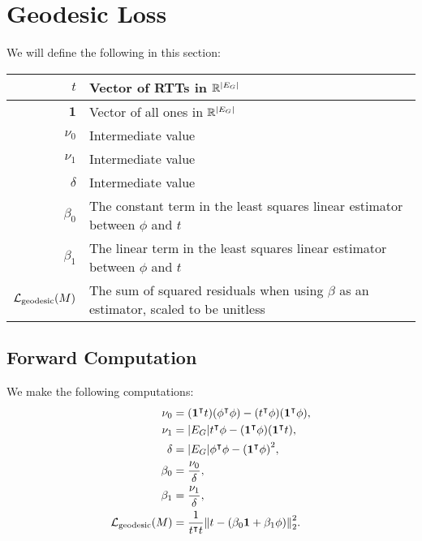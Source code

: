 \section{Geodesic Loss}

We will define the following in this section: \begin{center}\begin{tabular}{r|l}
	\(t\) & Vector of RTTs in \(\mathbb{R}^{\abs{E_G}}\) \\ \hline
	\(\mathbf{1}\) & Vector of all ones in \(\mathbb{R}^{\abs{E_G}}\) \\ \hline
	\(\nu_0\) & Intermediate value \\ \hline
	\(\nu_1\) & Intermediate value \\ \hline
	\(\delta\) & Intermediate value \\ \hline
	\(\beta_0\) & The constant term in the least squares linear estimator between \(\phi\) and \(t\) \\ \hline
	\(\beta_1\) & The linear term in the least squares linear estimator between \(\phi\) and \(t\) \\ \hline
	\(\mathcal{L}_{\mathrm{geodesic}}\pof{M}\) & The sum of squared residuals when using \(\beta\) as an estimator, scaled to be unitless
\end{tabular}\end{center}

\subsection{Forward Computation}
We make the following computations: \begin{align*}
	\nu_0 &= \pof{\mathbf{1}^\intercal t}\pof{\phi^\intercal\phi} - \pof{t^\intercal\phi}\pof{\mathbf{1}^\intercal\phi}, \\
	\nu_1 &= \abs{E_G}t^\intercal\phi - \pof{\mathbf{1}^\intercal\phi}\pof{\mathbf{1}^\intercal t}, \\
	\delta &= \abs{E_G}\phi^\intercal\phi - \pof{\mathbf{1}^\intercal\phi}^2, \\
	\beta_0 &= \frac{\nu_0}{\delta}, \\
	\beta_1 &= \frac{\nu_1}{\delta}, \\
	\mathcal{L}_{\mathrm{geodesic}}\pof{M} &= \frac{1}{t^\intercal t}\norm{t - \pof{\beta_0\mathbf{1} + \beta_1\phi}}_2^2. \\
\end{align*}

